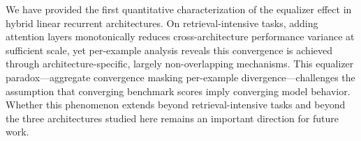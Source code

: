 \documentclass[11pt,a4paper]{article}
\begin{document}
We have provided the first quantitative characterization of the equalizer effect in hybrid linear recurrent architectures. On retrieval-intensive tasks, adding attention layers monotonically reduces cross-architecture performance variance at sufficient scale, yet per-example analysis reveals this convergence is achieved through architecture-specific, largely non-overlapping mechanisms. This equalizer paradox---aggregate convergence masking per-example divergence---challenges the assumption that converging benchmark scores imply converging model behavior. Whether this phenomenon extends beyond retrieval-intensive tasks and beyond the three architectures studied here remains an important direction for future work.


\end{document}
